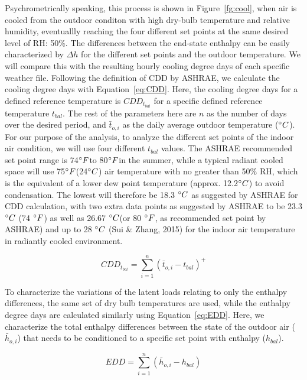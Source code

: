     Psychrometrically speaking, this process is shown in Figure~\ref{fg:cool}, when air is cooled from the outdoor conditon with high dry-bulb temperature and relative humidity, eventuallly reaching the four different set points at the same desired level of RH: 50\%. The differences between the end-state enthalpy can be easily characterized by $\Delta h$ for the different set points and the outdoor temperature. We will compare this with the resulting hourly cooling degree days of each specific weather file. Following the definition of CDD by ASHRAE, we calculate the cooling degree days with Equation~\ref{eq:CDD}. Here, the cooling degree days for a defined reference temperature is $CDD_{t_{bal}}$ for a specific defined reference temperature $t_{bal}$. The rest of the parameters here are $n$ as the number of days over the desired period, and $\bar t_{o,i}$ as the daily average outdoor temperature ($\degree C$). For our purpose of the analysis, to analyze the different set points of the indoor air condition, we will use four different $t_{bal}$ values.     The ASHRAE recommended set point range is 74$\degree F$to 80$\degree F$in the summer, while a typical radiant cooled space will use 75$\degree F$(24$\degree C$) air temperature with no greater than 50\% RH, which is the equivalent of a lower dew point temperature (approx. 12.2$\degree C$) to avoid condensation.  The lowest will therefore be 18.3 $\degree C$ as suggested by ASHRAE for CDD calculation, with two extra data points as suggested by ASHRAE to be 23.3 $\degree C$ (74 $\degree F$) as well as 26.67 $\degree C$(or 80 $\degree F$, as recommended set point by ASHRAE) and up to 28 $\degree C$ (Sui \& Zhang, 2015) for the indoor air temperature in radiantly cooled environment. 

    \begin{equation}
    CDD_{t_{bal}} = \sum_{i=1}^n (\bar t_{o,i}-t_{bal})^{+}\label{eq:CDD}
    \end{equation} 

    To characterize the variations of the latent loads relating to only the enthalpy differences, the same set of dry bulb temperatures are used, while the enthalpy degree days are calculated similarly using Equation~\ref{eq:EDD}. Here, we characterize the total enthalpy differences between the state of the outdoor air ($\bar h_{o,i}$) that needs to be conditioned to a specific set point with enthalpy ($h_{bal}$). 

    \begin{equation}
    EDD = \sum^n_{i=1}(\bar h_{o,i}-h_{bal})\label{eq:EDD}
    \end{equation}

